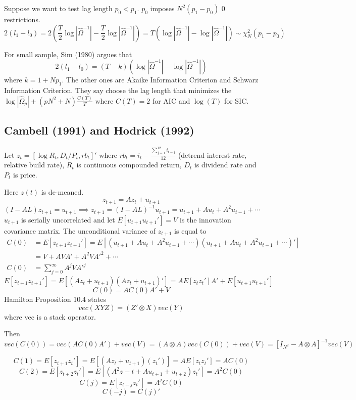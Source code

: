 \documentclass[11pt, a4paper, oneside]{article}
\theoremstyle{definition}
\theoremstyle{proposition}
\theoremstyle{corollary}
\theoremstyle{lemma}
\theoremstyle{theorem}
\begin{document}
Suppose we want to test lag length $p_0 < p_1$. $p_0$ imposes $N^2(p_1 - p_0)$ 0 restrictions. $$2(l_1 - l_0) = 2\left(\frac{T}{2}\log\left|\hat{\Omega}^{-1}\right| - \frac{T}{2}\log\left|\hat{\Omega}^{-1}\right|\right) = T\left(\log\left|\hat{\Omega}^{-1}\right| -\log\left|\hat{\Omega}^{-1}\right|\right) \sim \chi^2_N(p_1 - p_0)$$

For small sample, Sim (1980) argues that $$2(l_1- l_0) = (T-k)\left(\log\left|\hat{\Omega}^{-1}\right| -\log\left|\hat{\Omega}^{-1}\right|\right)$$
where $k = 1 + Np_1$. The other ones are Akaike Information Criterion and Schwarz Information Criterion. They say choose the lag length that minimizes the $\log\left|\hat{\Omega}_p\right| + (pN^2 + N)\frac{C(T)}{T}$ where $C(T) = 2$ for AIC and $\log(T)$ for SIC.  

\subsection{Cambell (1991) and Hodrick (1992)}
Let $z_t = [\log R_t, D_t/P_t, rb_t]'$ where $rb_t = i_t -\frac{ \sum_{j=1}^{12}i_{t -j}}{12}$ (detrend interest rate, relative build rate), $R_t$ is continuous compounded return, $D_t$ is dividend rate and $P_t$ is price. 

Here $z(t)$ is de-meaned. 
$$z_{t+1} = Az_t + u_{t+1}$$
$$(I - AL)z_{t+1} = u_{t+1} \implies z_{t+1} = (I -AL)^{-1}u_{t+1} = u_{t+1} + Au_t + A^2u_{t-1}+ \cdots$$
$u_{t+1}$ is serially uncorrelated and let $E[u_{t+1}u_{t+1}'] = V$ is the innovation covariance matrix. The unconditional variance of $z_{t+1}$ is equal to 
\begin{align*}
C(0) &= E[z_{t+1}z_{t+1}'] = E[(u_{t+1} +Au_t + A^2u_{t-1} + \cdots)(u_{t+1} +Au_t + A^2u_{t-1} + \cdots)']\\
&=V + AVA' +  A^2VA'^2 + \cdots \\
C(0) &= \sum_{j=0}^{\infty} A^jVA'^j 
\end{align*}
$$E[z_{t+1}z_{t+1}'] = E[(Az_t + u_{t+1})(Az_t + u_{t+1})'] = AE[z_tz_t']A' + E[u_{t+1}u_{t+1}']$$
$$C(0) = AC(0)A' + V$$
Hamilton Proposition 10.4 states 
$$vec(XYZ) = (Z'\otimes X)vec(Y)$$ where vec is a stack operator. 

Then $$vec(C(0)) = vec(A C(0) A') + vec(V) = (A\otimes A)vec(C(0)) + vec(V) = [I_{N^2} - A\otimes A]^{-1}vec(V)$$

$$C(1) = E[z_{t+1}z_t'] = E[(Az_t + u_{t+1})(z_t')] = AE[z_tz_t'] = AC(0)$$
$$C(2) = E[z_{t+2}z_t'] = E[(A^2z-t+ Au_{t+1}+u_{t+2})z_t'] = A^2C(0)$$
$$C(j) = E[z_{t+j}z_t'] = A^j C(0)$$
$$C(-j) = C(j)'$$
\end{document}
